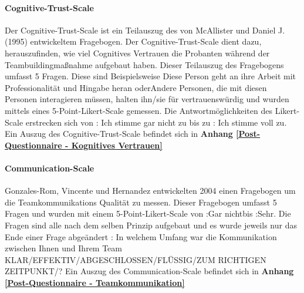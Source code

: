 \documentclass[a4paper,11pt]{article}%
\renewcommand{\\}{\vspace*{0.5\baselineskip} \newline}
\begin{document}
			\paragraph{Cognitive-Trust-Scale}
Der Cognitive-Trust-Scale ist ein Teilauszug des von McAllister und Daniel J. (1995) \citep[p.37]{mcallister1995affect} entwickeltem Fragebogen. Der Cognitive-Trust-Scale dient dazu, herauszufinden, wie viel Cognitives Vertrauen die Probanten während der Teambuildingmaßnahme aufgebaut haben. Dieser Teilauszug des Fragebogens umfasst 5 Fragen. Diese sind Beispielsweise \flqq Diese Person geht an ihre Arbeit mit Professionalität und Hingabe heran \frqq oder\flqq Andere Personen, die mit diesen Personen interagieren müssen, halten ihn/sie für vertrauenswürdig und wurden mittels eines 5-Point-Likert-Scale gemessen. Die Antwortmöglichkeiten des Likert-Scale erstrecken sich von : Ich stimme gar nicht zu \frqq bis zu : Ich stimme voll zu. 
\\Ein Auszug des Cognitive-Trust-Scale befindet sich in \textbf{Anhang \ref{Post-Questionnaire - Kognitives Vertrauen}}

  


			\paragraph{Communication-Scale}
Gonzales-Rom, Vincente und Hernandez \citep[p.1049]{gonzalez2014climate}entwickelten 2004 einen Fragebogen um die Teamkommunikations Qualität zu messen. Dieser Fragebogen umfasst 5 Fragen und wurden mit einem 5-Point-Likert-Scale von :Gar nicht\frqq bis :Sehr\frqq. Die Fragen sind alle nach dem selben Prinzip aufgebaut und es wurde jeweils nur das Ende einer Frage abgeändert : \flqq In welchem Umfang war die Kommunikation zwischen Ihnen und Ihrem Team KLAR/EFFEKTIV/ABGESCHLOSSEN/FLÜSSIG/ZUM RICHTIGEN ZEITPUNKT/?\frqq 
\\Ein Auszug des Communication-Scale befindet sich in \textbf{Anhang \ref{Post-Questionnaire - Teamkommunikation}}
\end{document}
